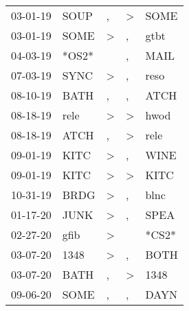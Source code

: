 \begin{supertabular}{lllll}
 03-01-19 &   SOUP &                , &     \textgreater &   SOME \\
 03-01-19 &   SOME &     \textgreater &                , &   gtbt \\
 04-03-19 &  *OS2* &                  &                , &   MAIL \\
 07-03-19 &   SYNC &     \textgreater &                , &   reso \\
 08-10-19 &   BATH &                , &                , &   ATCH \\
 08-18-19 &   rele &     \textgreater &     \textgreater &   hwod \\
 08-18-19 &   ATCH &                , &     \textgreater &   rele \\
 09-01-19 &   KITC &     \textgreater &                , &   WINE \\
 09-01-19 &   KITC &     \textgreater &     \textgreater &   KITC \\
 10-31-19 &   BRDG &     \textgreater &                , &   blnc \\
 01-17-20 &   JUNK &     \textgreater &                , &   SPEA \\
 02-27-20 &   gfib &     \textgreater &                  &  *CS2* \\
 03-07-20 &   1348 &     \textgreater &                , &   BOTH \\
 03-07-20 &   BATH &                , &     \textgreater &   1348 \\
 09-06-20 &   SOME &                , &                , &   DAYN \\
\end{supertabular}
